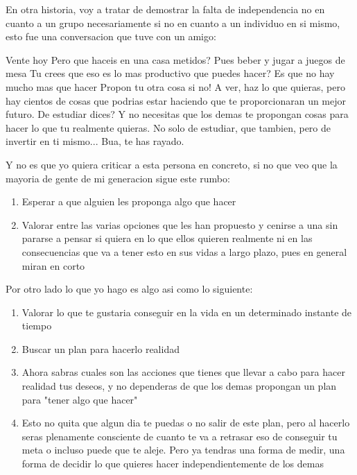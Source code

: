 En otra historia, voy a tratar de demostrar la falta de independencia no en cuanto a un grupo necesariamente si no en cuanto a un individuo en si mismo, esto fue una conversacion que tuve con un amigo: 

\begin{dialogue}
	 Vente hoy
	 Pero que haceis en una casa metidos?
	 Pues beber y jugar a juegos de mesa
	 Tu crees que eso es lo mas productivo que puedes hacer?
	 Es que no hay mucho mas que hacer
	 Propon tu otra cosa si no!
	 A ver, haz lo que quieras, pero hay cientos de cosas que podrias estar haciendo que te proporcionaran un mejor futuro. 
	 De estudiar dices?
	 Y no necesitas que los demas te propongan cosas para hacer lo que tu realmente quieras.
	 No solo de estudiar, que tambien, pero de invertir en ti mismo...
	 Bua, te has rayado.

\end{dialogue}

Y no es que yo quiera criticar a esta persona en concreto, si no que veo que la mayoria de gente de mi generacion sigue este rumbo:

\begin{enumerate}
	\item Esperar a que alguien les proponga algo que hacer
	\item Valorar entre las varias opciones que les han propuesto y cenirse a una sin pararse a pensar si quiera en lo que ellos quieren realmente ni en las consecuencias que va a tener esto en sus vidas a largo plazo, pues en general miran en corto
\end{enumerate}

Por otro lado lo que yo hago es algo asi como lo siguiente:

\begin{enumerate}
	\item Valorar lo que te gustaria conseguir en la vida en un determinado instante de tiempo
	\item Buscar un plan para hacerlo realidad
	\item Ahora sabras cuales son las acciones que tienes que llevar a cabo para hacer realidad tus deseos, y no dependeras de que los demas propongan un plan para "tener algo que hacer"
	\item Esto no quita que algun dia te puedas o no salir de este plan, pero al hacerlo seras plenamente consciente de cuanto te va a retrasar eso de conseguir tu meta o incluso puede que te aleje. Pero ya tendras una forma de medir, una forma de decidir lo que quieres hacer independientemente de los demas
\end{enumerate}
 
